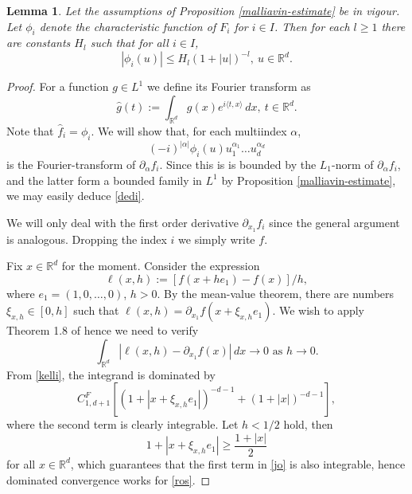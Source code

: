 \documentclass{article}
\newtheorem{lemma}[theorem]{Lemma}
\begin{document}
\begin{lemma}\label{majd} Let the assumptions of Proposition \ref{malliavin-estimate} be in vigour.
Let $\phi_{i}$ denote the characteristic function of $F_{i}$ for $i\in I$. Then for each $l\geq 1$ there are constants $H_{l}$
such that for all $i\in I$,
\begin{equation}\label{dedi}
|\phi_{i}(u)|\leq H_{l}(1+|u|)^{-l},\ u\in\mathbb{R}^{d}.
\end{equation}
\end{lemma}
\begin{proof} For a function $g\in L^{1}$ we define its Fourier transform as $$
\hat{g}(t):=\int_{\mathbb{R}^{d}}g(x)e^{i\langle t,x\rangle}\, dx,\ t\in\mathbb{R}^{d}.
$$
Note that $\hat{f}_{i}=\phi_{i}$.
We will show that, for each multiindex $\alpha$, 
$$
(-i)^{|\alpha|}\phi_{i}(u)u_{1}^{\alpha_{1}}\ldots u_{d}^{\alpha_{d}}
$$ 
is the Fourier-transform of $\partial_{\alpha}f_{i}$. Since this is
is bounded by the $L_{1}$-norm of $\partial_{\alpha}f_{i}$, and the latter form a 
bounded family in $L^{1}$ by Proposition \ref{malliavin-estimate},
we may easily deduce \eqref{dedi}.
  
We will only deal with the first order derivative $\partial_{x_{1}}f_{i}$ since the general argument is analogous. Dropping
the index $i$ we simply write $f$.

Fix $x\in\mathbb{R}^{d}$ for the moment. Consider the expression $$\ell(x,h):=[f(x+he_{1})-f(x)]/h,$$ where $e_{1}=(1,0,\ldots,0)$, $h>0$. By the 
mean-value theorem, there are numbers $\xi_{x,h}\in [0,h]$ such that $\ell(x,h)=\partial_{x_{1}}f(x+\xi_{x,h}e_{1})$. We wish to apply
Theorem 1.8 of \cite{fourier} hence we need to verify
\begin{equation}\label{ros}
\int_{\mathbb{R}^{d}}|\ell(x,h)-\partial_{x_{1}}f(x)|\, dx\to 0\mbox{ as }h\to 0.
\end{equation}
From \eqref{kelli}, the integrand is dominated by
\begin{equation}\label{jo}
C_{1,d+1}^{F}[(1+|x+\xi_{x,h}e_{1}|)^{-d-1}+(1+|x|)^{-d-1}],
\end{equation}
where the second term is clearly integrable. Let $h<1/2$ hold, then
$$
1+|x+\xi_{x,h}e_{1}|\geq \frac{1+|x|}{2}
$$
for all $x\in\mathbb{R}^{d}$, 
which guarantees that the first term in \eqref{jo} is also integrable, hence dominated convergence works for \eqref{ros}.
\end{proof}
 
\end{document}
